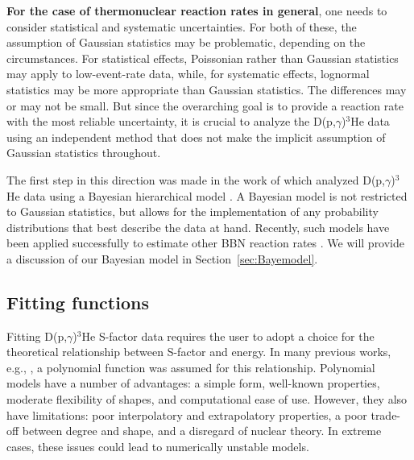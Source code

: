 \documentclass[twocolumn]{aastex63}
\begin{document}

{\bf For the case of thermonuclear reaction rates in general}, one needs to consider statistical and systematic uncertainties. For both of these, the assumption of Gaussian statistics may be problematic, depending on the circumstances. For statistical effects, Poissonian rather than Gaussian statistics may apply to low-event-rate data, while, for systematic effects, lognormal statistics may be more appropriate than Gaussian statistics. The differences may or may not be small. But since the overarching goal is to provide a reaction rate with the most reliable uncertainty, it is crucial to analyze the D(p,$\gamma$)$^3$He data using an independent method that does not make the implicit assumption of Gaussian statistics throughout.

The first step in this direction was made in the work of \citet{iliadis16} which analyzed D(p,$\gamma$)$^3$He data using a Bayesian hierarchical model \citep{2017bmad}. A Bayesian model is not restricted to Gaussian statistics, but allows for the implementation of any probability distributions that best describe the data at hand. Recently, such models have been applied successfully to estimate other BBN reaction rates \citep{gomez17,deSouza:2019gf,deSouza:2019gi,de_Souza_2020}. We will provide a discussion of our Bayesian model in Section~\ref{sec:Bayemodel}.

\subsection{Fitting functions} 
\label{sec:function}
Fitting D(p,$\gamma$)$^3$He S-factor data requires the user to adopt a choice for the theoretical relationship between S-factor and energy. In many previous works, e.g., \citet{Mossa20,Yeh21,Pis21}, a polynomial function was assumed for this relationship. Polynomial models have a number of advantages: a simple form, well-known properties, moderate flexibility of shapes, and computational ease of use. However, they also have limitations: poor interpolatory and extrapolatory properties, a poor trade-off between degree and shape, and a disregard of nuclear theory. In extreme cases, these issues could lead to numerically unstable models. 
\end{document}
